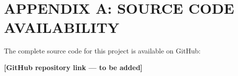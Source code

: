\chapter*{APPENDIX A: SOURCE CODE AVAILABILITY}


The complete source code for this project is available on GitHub:

\begin{center}
\textbf{[GitHub repository link --- to be added]}
\end{center}


